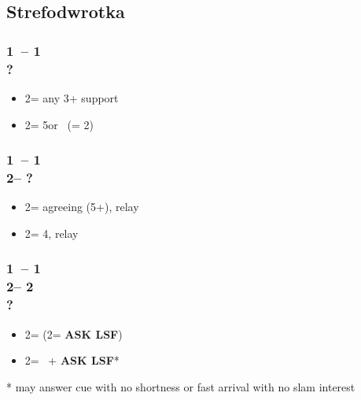 \documentclass[12pt, a4paper]{report}
\renewcommand{\lsf}{{\color{BrickRed}\textbf{ASK LSF}}}
\begin{document}
\begin{bidpage}
\section{Strefodwrotka}

\subsubsection*{1\clubs\ -- 1\major\\
                ?}
\begin{itemize}
    \item 2\diams = any 3+ support \gf
    \item 2\nt = 5\diams or \bal\ \gf (= 2\hearts)
\end{itemize}
\end{bidpage}

\begin{bidpage}
\subsubsection*{1\clubs\ -- 1\major\\
                2\diams -- ?}
\begin{itemize}
    \item 2\hearts = agreeing \major (5+), relay
    \item 2\spades = 4\major, relay
\end{itemize}
\end{bidpage}

\begin{bidpage}
\subsubsection*{1\clubs\ -- 1\major\\
                2\diams -- 2\hearts\\
                ?}
\begin{itemize}
    \item 2\spades = \unbal (2\nt = \lsf)
    \item 2\nt = \bal\ + \lsf*
\end{itemize}

* may answer cue with no shortness or fast arrival with no slam interest
\end{bidpage}
\end{document}

